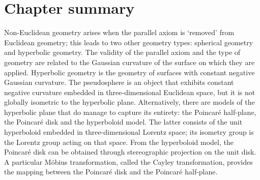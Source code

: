 \section*{Chapter summary}
Non-Euclidean geometry arises when the parallel axiom is `removed' from Euclidean geometry; this leads to two other geometry types: spherical geometry and hyperbolic geometry. The validity of the parallel axiom and the type of geometry  are related to the Gaussian curvature of the surface on which they are applied. Hyperbolic geometry is the geometry of surfaces with constant negative Gaussian curvature. The pseudosphere is an object that exhibits constant negative curvature embedded in three-dimensional Euclidean space, but it is not globally isometric to the hyperbolic plane. Alternatively, there are models of the hyperbolic plane that do manage to capture its entirety: the Poincaré half-plane, the Poincaré disk and the hyperboloid model. The latter consists of the unit hyperboloid embedded in three-dimensional Lorentz space; its isometry group is the Lorentz group acting on that space. From the hyperboloid model, the Poincaré disk can be obtained through stereographic projection on the unit disk. A particular Möbius transformation, called the Cayley transformation, provides the mapping between the Poincaré disk and the Poincaré half-plane.